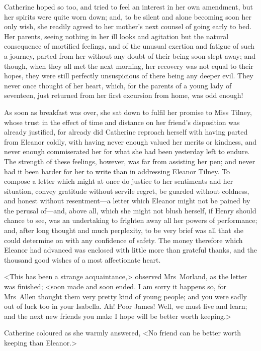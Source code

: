  Catherine hoped so too, and tried to feel an interest in her own amendment, but her spirits were quite worn down; and, to be silent and alone becoming soon her only wish, she readily agreed to her mother's next counsel of going early to bed. Her parents, seeing nothing in her ill looks and agitation but the natural consequence of mortified feelings, and of the unusual exertion and fatigue of such a journey, parted from her without any doubt of their being soon slept away; and though, when they all met the next morning, her recovery was not equal to their hopes, they were still perfectly unsuspicious of there being any deeper evil. They never once thought of her heart, which, for the parents of a young lady of seventeen, just returned from her first excursion from home, was odd enough! 

 As soon as breakfast was over, she sat down to fulfil her promise to Miss Tilney, whose trust in the effect of time and distance on her friend's disposition was already justified, for already did Catherine reproach herself with having parted from Eleanor coldly, with having never enough valued her merits or kindness, and never enough commiserated her for what she had been yesterday left to endure. The strength of these feelings, however, was far from assisting her pen; and never had it been harder for her to write than in addressing Eleanor Tilney. To compose a letter which might at once do justice to her sentiments and her situation, convey gratitude without servile regret, be guarded without coldness, and honest without resentment—a letter which Eleanor might not be pained by the perusal of—and, above all, which she might not blush herself, if Henry should chance to see, was an undertaking to frighten away all her powers of performance; and, after long thought and much perplexity, to be very brief was all that she could determine on with any confidence of safety. The money therefore which Eleanor had advanced was enclosed with little more than grateful thanks, and the thousand good wishes of a most affectionate heart. 

 <This has been a strange acquaintance,> observed Mrs~Morland, as the letter was finished; <soon made and soon ended. I am sorry it happens so, for Mrs~Allen thought them very pretty kind of young people; and you were sadly out of luck too in your Isabella. Ah! Poor James! Well, we must live and learn; and the next new friends you make I hope will be better worth keeping.> 

 Catherine coloured as she warmly answered, <No friend can be better worth keeping than Eleanor.> 


